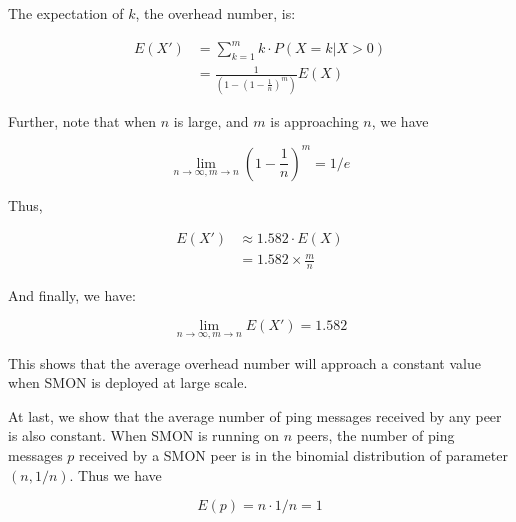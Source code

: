 The expectation of $k$, the overhead number, is:

\begin{equation*}
\begin{aligned}
E(X') &= \sum_{k=1}^m k \cdot P(X=k|X>0)  \\
      &= \frac{1}{(1 - (1 - \frac{1}{n})^{m})} E(X)
\end{aligned}
\end{equation*}

Further, note that when $n$ is large, and $m$ is approaching
$n$, we have

\begin{equation*}
\lim_{n \to \infty, m \to n} (1 - \frac{1}{n})^{m} = 1 / e
\end{equation*}

Thus,

\begin{equation*}
\begin{aligned}
E(X') &\approx 1.582 \cdot E(X) \\
      &= 1.582 \times \frac{m}{n}
\end{aligned}
\end{equation*}

And finally, we have:

\begin{equation*}
\lim_{n \to \infty, m \to n} E(X') = 1.582
\end{equation*}

This shows that the average overhead number will approach a
constant value when SMON is deployed at large scale.

At last, we show that the average number of ping messages
received by any peer is also constant.  When SMON is running
on $n$ peers, the number of ping messages $p$ received by a
SMON peer is in the binomial distribution of parameter $(n,
1/n)$. Thus we have

\begin{equation*}
E(p) = n \cdot 1/n = 1
\end{equation*}





